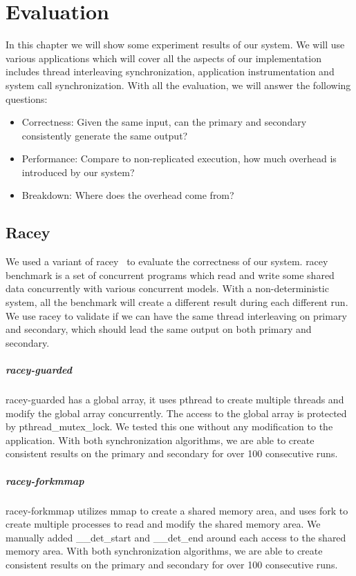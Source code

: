 \chapter{Evaluation}

In this chapter we will show some experiment results of our system. We will use various applications which will cover all the aspects of our implementation includes thread interleaving synchronization, application instrumentation and system call synchronization. With all the evaluation, we will answer the following questions:

\begin{itemize}
  \item Correctness: Given the same input, can the primary and secondary consistently generate the same output?
  \item Performance: Compare to non-replicated execution, how much overhead is introduced by our system?
  \item Breakdown: Where does the overhead come from?
\end{itemize}
\section{Racey}
We used a variant of racey~\cite{hillstress} to evaluate the correctness of our system. racey benchmark is a set of concurrent programs which read and write some shared data concurrently with various concurrent models. With a non-deterministic system, all the benchmark will create a different result during each different run. We use racey to validate if we can have the same thread interleaving on primary and secondary, which should lead the same output on both primary and secondary.

\paragraph{racey-guarded} racey-guarded has a global array, it uses pthread to create multiple threads and modify the global array concurrently. The access to the global array is protected by pthread\_mutex\_lock. We tested this one without any modification to the application. With both synchronization algorithms, we are able to create consistent results on the primary and secondary for over 100 consecutive runs.

\paragraph{racey-forkmmap} racey-forkmmap utilizes mmap to create a shared memory area, and uses fork to create multiple processes to read and modify the shared memory area. We manually added \_\_det\_start and \_\_det\_end around each access to the shared memory area. With both synchronization algorithms, we are able to create consistent results on the primary and secondary for over 100 consecutive runs.

